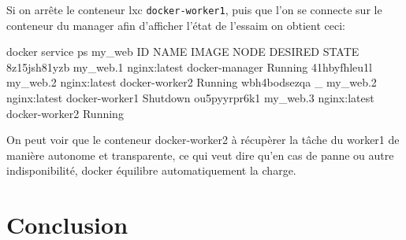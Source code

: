 Si on arrête le conteneur lxc \verb:docker-worker1:, puis que l'on se connecte sur le
conteneur du manager afin d'afficher l'état de l'essaim on obtient ceci:

\begin{bash}
docker service ps my_web
ID           NAME         IMAGE        NODE           DESIRED STATE   
8z15jsh81yzb my_web.1     nginx:latest docker-manager Running         
41hbyfhleu1l my_web.2     nginx:latest docker-worker2 Running        
wbh4bodsezqa  \_ my_web.2 nginx:latest docker-worker1 Shutdown      
ou5pyyrpr6k1 my_web.3     nginx:latest docker-worker2 Running      
\end{bash}

On peut voir que le conteneur docker-worker2 à récupèrer la tâche du worker1 de manière
autonome et transparente, ce qui veut dire qu'en cas de panne ou autre indisponibilité, 
docker équilibre automatiquement la charge.


\chapter{Conclusion}
